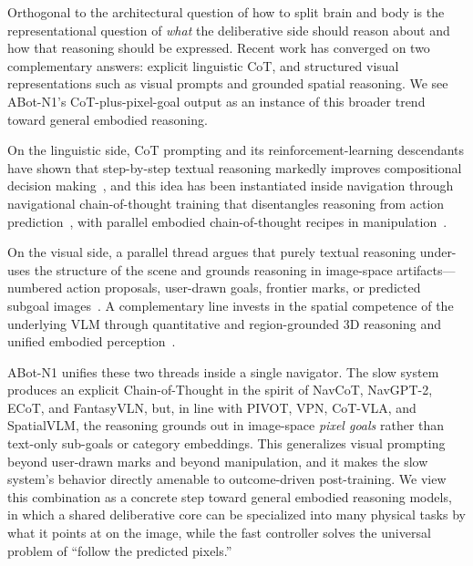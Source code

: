 Orthogonal to the architectural question of how to split brain and body
is the representational question of \emph{what} the deliberative side
should reason about and how that reasoning should be expressed. Recent
work has converged on two complementary answers: explicit linguistic
CoT, and structured visual representations such as visual
prompts and grounded spatial reasoning. We see ABot-N1's CoT-plus-pixel-goal
output as an instance of this broader trend toward general embodied
reasoning.

On the linguistic side, CoT prompting and its
reinforcement-learning descendants have shown that step-by-step textual
reasoning markedly improves compositional decision
making~\cite{wei2022cot,deepseekai2025r1}, and this idea has been
instantiated inside navigation through navigational chain-of-thought
training that disentangles reasoning from action
prediction~\cite{zhou2024navgpt2,lin2025navcot,zuo2026fantasyvln}, with
parallel embodied chain-of-thought recipes in
manipulation~\cite{zawalski2024ecot,sun2025emmax}.

On the visual side, a parallel thread argues that purely textual
reasoning under-uses the structure of the scene and grounds reasoning in
image-space artifacts---numbered action proposals, user-drawn goals,
frontier marks, or predicted subgoal
images~\cite{nasiriany2024pivot,feng2026vpn,sun2026openfrontier,zhao2025cotvla}.
A complementary line invests in the spatial competence of the underlying
VLM through quantitative and region-grounded 3D reasoning and unified
embodied perception~\cite{chen2024spatialvlm,cheng2024spatialrgpt,baai2026robobrain25}.

ABot-N1 unifies these two threads inside a single navigator. The slow
system produces an explicit Chain-of-Thought in the spirit of NavCoT,
NavGPT-2, ECoT, and FantasyVLN, but, in line with PIVOT, VPN, CoT-VLA,
and SpatialVLM, the reasoning grounds out in image-space \emph{pixel
goals} rather than text-only sub-goals or category embeddings. This
generalizes visual prompting beyond user-drawn marks and beyond
manipulation, and it makes the slow system's behavior directly
amenable to outcome-driven post-training. We view this combination as a
concrete step toward general embodied reasoning models, in which a
shared deliberative core can be specialized into many physical tasks by
what it points at on the image, while the fast controller solves the
universal problem of ``follow the predicted pixels.''
